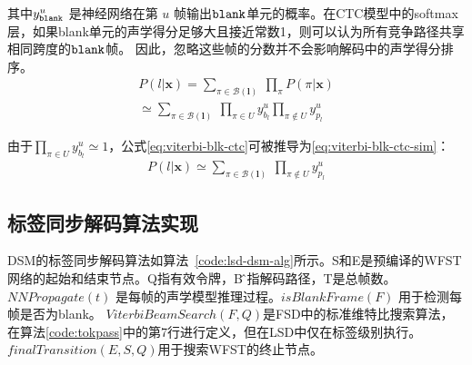 其中$y^{u}_{\tt{blank}}$ 是神经网络在第 $u$ 帧输出$\tt blank$单元的概率。在CTC模型中的softmax层，如果blank单元的声学得分足够大且接近常数1，则可以认为所有竞争路径共享相同跨度的$\tt blank$帧。 因此，忽略这些帧的分数并不会影响解码中的声学得分排序。
  \begin{equation} \label{eq:viterbi-blk-ctc}
  \begin{split}
      P(l|\mathbf{x})
      =\sum_{\pi\in\mathcal{B}(\mathbf{l})}
          \ \prod_{\pi}P(\pi|\mathbf{x})\\
        \simeq\sum_{\pi\in\mathcal{B}(\mathbf{l})}
         \  \prod_{\pi\in U}{y_{b_l}^u}{\prod_{\pi\not\in U}{y_{p_l}^u}}
        \end{split}
       \end{equation}


由于$\prod_{\pi\in U}{y_{b_l}^u}\simeq 1$，公式\ref{eq:viterbi-blk-ctc}可被推导为\ref{eq:viterbi-blk-ctc-sim}：
  \begin{equation} \label{eq:viterbi-blk-ctc-sim}
  \begin{split}
      P(l|\mathbf{x})
        \simeq\sum_{\pi\in\mathcal{B}(\mathbf{l})}
         \  {\prod_{\pi\not\in U}{y_{p_l}^u}}
        \end{split}
       \end{equation}

\subsection{标签同步解码算法实现}
\label{chap:lsd-lsd-ctc-alg}

DSM的标签同步解码算法如算法~\ref{code:lsd-dsm-alg}所示。S和E是预编译的WFST网络的起始和结束节点。Q指有效令牌，B ̂指解码路径，T是总帧数。$NNPropagate(t)$ 是每帧的声学模型推理过程。$isBlankFrame(F)$ 用于检测每帧是否为blank。 $ViterbiBeamSearch(F, Q)$是FSD中的标准维特比搜索算法，在算法\ref{code:tokpass}中的第7行进行定义，但在LSD中仅在标签级别执行。  $finalTransition(E,S,Q)$用于搜索WFST的终止节点\cite{hori2007efficient}。


